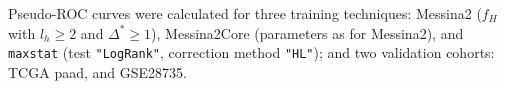 \documentclass[dissertation.tex]{subfiles}
\begin{document}
Pseudo-\gls{ROC} curves were calculated for three training techniques: Messina2 ($f_H$ with $l_h \geq 2$ and $\Delta^* \geq 1$), Messina2Core (parameters as for Messina2), and \texttt{maxstat} (test \texttt{"LogRank"}, correction method \texttt{"HL"}); and two validation cohorts: \gls{TCGA} paad, and GSE28735.
\end{document}
